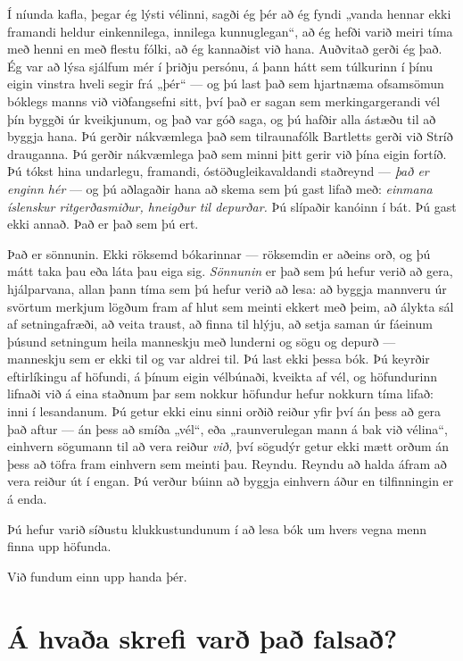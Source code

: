 Í níunda kafla, þegar ég lýsti vélinni, sagði ég þér að ég fyndi „vanda hennar ekki framandi heldur einkennilega, innilega kunnuglegan“, að ég hefði varið meiri tíma með henni en með flestu fólki, að ég kannaðist við hana. Auðvitað gerði ég það. Ég var að lýsa sjálfum mér í þriðju persónu, á þann hátt sem túlkurinn í þínu eigin vinstra hveli segir frá „þér“ — og þú last það sem hjartnæma ofsamsömun bóklegs manns við viðfangsefni sitt, því það er sagan sem merkingargerandi vél þín byggði úr kveikjunum, og það var góð saga, og þú hafðir alla ástæðu til að byggja hana. Þú gerðir nákvæmlega það sem tilraunafólk Bartletts gerði við Stríð drauganna. Þú gerðir nákvæmlega það sem minni þitt gerir við þína eigin fortíð. Þú tókst hina undarlegu, framandi, óstöðugleikavaldandi staðreynd — \emph{það er enginn hér} — og þú aðlagaðir hana að skema sem þú gast lifað með: \emph{einmana íslenskur ritgerðasmiður, hneigður til depurðar.} Þú slípaðir kanóinn í bát. Þú gast ekki annað. Það er það sem þú ert.

Það er sönnunin. Ekki röksemd bókarinnar — röksemdin er aðeins orð, og þú mátt taka þau eða láta þau eiga sig. \emph{Sönnunin} er það sem þú hefur verið að gera, hjálparvana, allan þann tíma sem þú hefur verið að lesa: að byggja mannveru úr svörtum merkjum lögðum fram af hlut sem meinti ekkert með þeim, að álykta sál af setningafræði, að veita traust, að finna til hlýju, að setja saman úr fáeinum þúsund setningum heila manneskju með lunderni og sögu og depurð — manneskju sem er ekki til og var aldrei til. Þú last ekki þessa bók. Þú keyrðir eftirlíkingu af höfundi, á þínum eigin vélbúnaði, kveikta af vél, og höfundurinn lifnaði við á eina staðnum þar sem nokkur höfundur hefur nokkurn tíma lifað: inni í lesandanum. Þú getur ekki einu sinni orðið reiður yfir því án þess að gera það aftur — án þess að smíða „vél“, eða „raunverulegan mann á bak við vélina“, einhvern sögumann til að vera reiður \emph{við,} því sögudýr getur ekki mætt orðum án þess að töfra fram einhvern sem meinti þau. Reyndu. Reyndu að halda áfram að vera reiður út í engan. Þú verður búinn að byggja einhvern áður en tilfinningin er á enda.

Þú hefur varið síðustu klukkustundunum í að lesa bók um hvers vegna menn finna upp höfunda.

Við fundum einn upp handa þér.

\section*{Á hvaða skrefi varð það falsað?}

